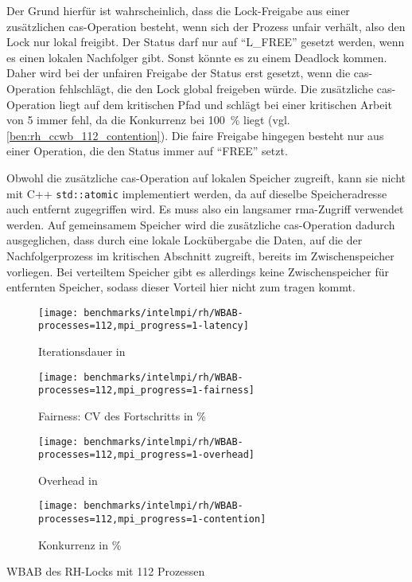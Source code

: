Der Grund hierfür ist wahrscheinlich,
dass die Lock-Freigabe aus einer zusätzlichen \gls{cas}-Operation besteht,
wenn sich der Prozess unfair verhält,
also den Lock nur lokal freigibt.
Der Status darf nur auf \enquote{L\_FREE} gesetzt werden,
wenn es einen lokalen Nachfolger gibt.
Sonst könnte es zu einem Deadlock kommen.
Daher wird bei der unfairen Freigabe der Status erst gesetzt,
wenn die \gls{cas}-Operation fehlschlägt,
die den Lock global freigeben würde.
Die zusätzliche \gls{cas}-Operation liegt auf dem kritischen Pfad
und schlägt bei einer kritischen Arbeit von 5 immer fehl,
da die \gls{Konkurrenz} bei 100~\% liegt (vgl. \autoref{ben:rh_ccwb_112_contention}).
Die faire Freigabe hingegen besteht nur aus einer Operation,
die den Status immer auf \enquote{FREE} setzt.

Obwohl die zusätzliche \gls{cas}-Operation auf lokalen Speicher zugreift,
kann sie nicht mit C++ \texttt{std::atomic} implementiert werden,
da auf dieselbe Speicheradresse auch entfernt zugegriffen wird.
Es muss also ein langsamer \gls{rma}-Zugriff verwendet werden.
Auf gemeinsamem Speicher wird die zusätzliche \gls{cas}-Operation dadurch ausgeglichen,
dass durch eine lokale Lockübergabe die Daten,
auf die der Nachfolgerprozess im kritischen Abschnitt zugreift,
bereits im \gls{Zwischenspeicher} vorliegen.
Bei verteiltem Speicher gibt es allerdings keine \gls{Zwischenspeicher} für entfernten Speicher,
sodass dieser Vorteil hier nicht zum tragen kommt.

\begin{benchmark}[h]
    \begin{subfigure}{.5\textwidth}
        \texttt{[image: benchmarks/intelmpi/rh/WBAB-processes=112,mpi\_progress=1-latency]}
        \caption{Iterationsdauer in }
        \label{ben:rh_wbab_112_latency}
    \end{subfigure}
    \begin{subfigure}{.5\textwidth}
        \texttt{[image: benchmarks/intelmpi/rh/WBAB-processes=112,mpi\_progress=1-fairness]}
        \caption{Fairness: CV des Fortschritts in \%}
        \label{ben:rh_wbab_112_fairness}
    \end{subfigure}
    \begin{subfigure}{.5\textwidth}
        \texttt{[image: benchmarks/intelmpi/rh/WBAB-processes=112,mpi\_progress=1-overhead]}
        \caption{Overhead in }
        \label{ben:rh_wbab_112_overhead}
    \end{subfigure}
    \begin{subfigure}{.5\textwidth}
        \texttt{[image: benchmarks/intelmpi/rh/WBAB-processes=112,mpi\_progress=1-contention]}
        \caption{Konkurrenz in \%}
        \label{ben:rh_wbab_112_contention}
    \end{subfigure}
    \caption{WBAB des RH-Locks mit 112 Prozessen}
    \label{ben:rh_wbab_112}
\end{benchmark}

